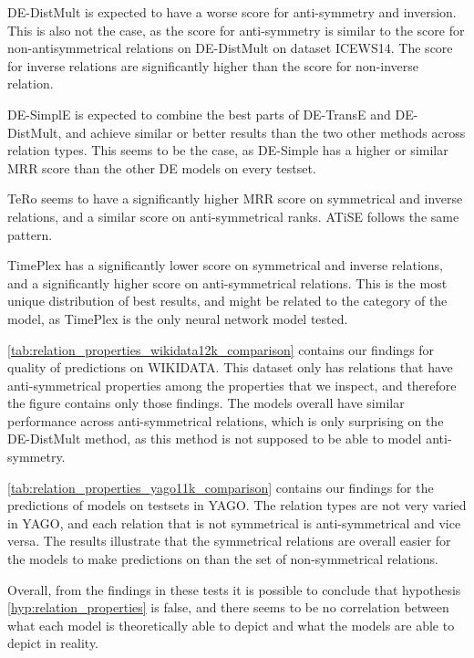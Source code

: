 DE-DistMult is expected to have a worse score for anti-symmetry and inversion. This is also not the case, as the score for anti-symmetry is similar to the score for non-antisymmetrical relations on DE-DistMult on dataset ICEWS14. The score for inverse relations are significantly higher than the score for non-inverse relation.

DE-SimplE is expected to combine the best parts of DE-TransE and DE-DistMult, and achieve similar or better results than the two other methods across relation types. This seems to be the case, as DE-Simple has a higher or similar MRR score than the other DE models on every testset.

TeRo seems to have a significantly higher MRR score on symmetrical and inverse relations, and a similar score on anti-symmetrical ranks. ATiSE follows the same pattern. 

TimePlex has a significantly lower score on symmetrical and inverse relations, and a significantly higher score on anti-symmetrical relations. This is the most unique distribution of best results, and might be related to the category of the model, as TimePlex is the only neural network model tested.

\autoref{tab:relation_properties_wikidata12k_comparison} contains our findings for quality of predictions on WIKIDATA. This dataset only has relations that have anti-symmetrical properties among the properties that we inspect, and therefore the figure contains only those findings. The models overall have similar performance across anti-symmetrical relations, which is only surprising on the DE-DistMult method, as this method is not supposed to be able to model anti-symmetry.

\autoref{tab:relation_properties_yago11k_comparison} contains our findings for the predictions of models on testsets in YAGO. The relation types are not very varied in YAGO, and each relation that is not symmetrical is anti-symmetrical and vice versa. The results illustrate that the symmetrical relations are overall easier for the models to make predictions on than the set of non-symmetrical relations.

Overall, from the findings in these tests it is possible to conclude that hypothesis \autoref{hyp:relation_properties} is false, and there seems to be no correlation between what each model is theoretically able to depict and what the models are able to depict in reality.


